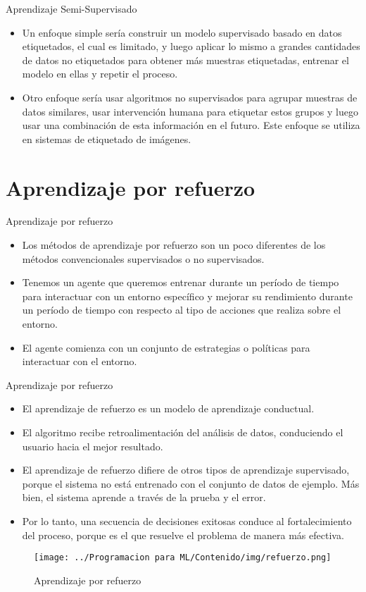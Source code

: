 \documentclass[11pt,aspectratio=169]{beamer}
\begin{document}
\begin{frame}{Aprendizaje Semi-Supervisado}
\begin{itemize}
	\item Un enfoque simple sería construir un modelo supervisado basado en datos etiquetados, el cual es limitado, y luego aplicar lo mismo a grandes 
		cantidades de datos no etiquetados para obtener más muestras etiquetadas, entrenar el modelo en ellas y repetir el proceso. \pause
	\item Otro enfoque sería usar algoritmos no supervisados para agrupar muestras de datos similares, usar intervención humana para etiquetar estos grupos 
		y luego usar una combinación de esta información en el futuro. Este enfoque se utiliza en sistemas de etiquetado de imágenes.
\end{itemize}
\end{frame}


\section{Aprendizaje por refuerzo}
\begin{frame}{Aprendizaje por refuerzo}
\begin{itemize}
	\item Los métodos de aprendizaje por refuerzo son un poco diferentes de los métodos convencionales supervisados o no supervisados.\pause
	\item Tenemos un agente que queremos entrenar durante un período de tiempo para interactuar con un entorno específico y mejorar su rendimiento 
		durante un período de tiempo con respecto al tipo de acciones que realiza sobre el entorno.\pause 
	\item El agente comienza con un conjunto de estrategias o políticas para interactuar con el entorno.
\end{itemize}
\end{frame}

\begin{frame}{Aprendizaje por refuerzo}
\begin{itemize}
	\item El aprendizaje de refuerzo es un modelo de aprendizaje conductual.\pause
	\item El algoritmo recibe retroalimentación del análisis de datos, conduciendo el usuario hacia el mejor resultado.\pause
	\item El aprendizaje de refuerzo difiere de otros tipos de aprendizaje supervisado, porque el sistema no está entrenado con el 
		conjunto de datos de ejemplo. Más bien, el sistema aprende a través de la prueba y el error.\pause
	\item Por lo tanto, una secuencia de decisiones exitosas conduce al fortalecimiento del proceso, porque es el que resuelve el 
		problema de manera más efectiva.
\end{itemize}
  \begin{figure}[H]
	\centering
	\texttt{[image: ../Programacion para ML/Contenido/img/refuerzo.png]}
	\caption{Aprendizaje por refuerzo}
\end{figure}
\end{frame}
\end{document}
